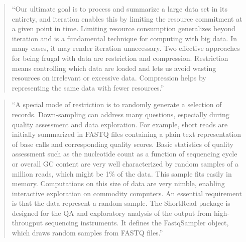 \documentclass[]{tufte-book}
\begin{document}
\begin{quote}
``Our ultimate goal is to process and summarize a large data set in its
entirety, and iteration enables this by limiting the resource commitment at a
given point in time. Limiting resource consumption generalizes beyond iteration
and is a fundamental technique for computing with big data. In many cases, it
may render iteration unnecessary. Two effective approaches for being frugal with
data are restriction and compression. Restriction means controlling which data
are loaded and lets us avoid wasting resources on irrelevant or excessive data.
Compression helps by representing the same data with fewer resources.''
\citep{lawrence2014scalable}
\end{quote}

\begin{quote}
``A special mode of restriction is to randomly generate a selection of records.
Down-sampling can address many questions, especially during quality assessment
and data exploration. For example, short reads are initially summarized in FASTQ
files containing a plain text representation of base calls and corresponding
quality scores. Basic statistics of quality assessment such as the nucleotide
count as a function of sequencing cycle or overall GC content are very well
characterized by random samples of a million reads, which might be 1\% of the
data. This sample fits easily in memory. Computations on this size of data are
very nimble, enabling interactive exploration on commodity computers. An
essential requirement is that the data represent a random sample. The ShortRead
package is designed for the QA and exploratory analysis of the output from
high-througput sequencing instruments. It defines the FastqSampler object, which
draws random samples from FASTQ files.'' \citep{lawrence2014scalable}
\end{quote}
\end{document}
